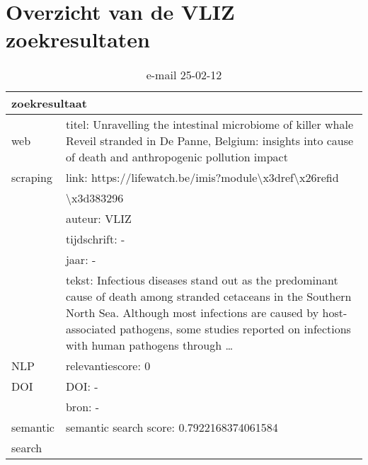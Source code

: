 \section{Overzicht van de VLIZ zoekresultaten}
\begin{table}[h!]
    \caption{e-mail 25-02-12}
    \centering
    \begin{tabularx}{\textwidth}{|p{4cm}|X|} 
        \hline
        \multicolumn{2}{|X|}{\textbf{zoekresultaat}} \\
        \hline
        web &titel: Unravelling the intestinal microbiome of killer whale Reveil stranded in De Panne, Belgium: insights into cause of death and anthropogenic pollution impact\\
        scraping&link: https://lifewatch.be/imis?module\textbackslash x3dref\textbackslash x26refid\\&\textbackslash x3d383296\\
        &auteur: VLIZ\\
        &tijdschrift: -\\
        &jaar: -\\
        &tekst: Infectious diseases stand out as the predominant cause of death among stranded cetaceans in the Southern North Sea. Although most infections are caused by host-associated pathogens, some studies reported on infections with human pathogens through …\\
        \hline
        NLP&relevantiescore: 0\\
        \hline
        DOI&DOI: -\\
        &bron: -\\
        \hline
        semantic&semantic search score: 0.7922168374061584\\
        search&\\
        \hline
    \end{tabularx}
    \label{table:email20250212}
\end{table}
